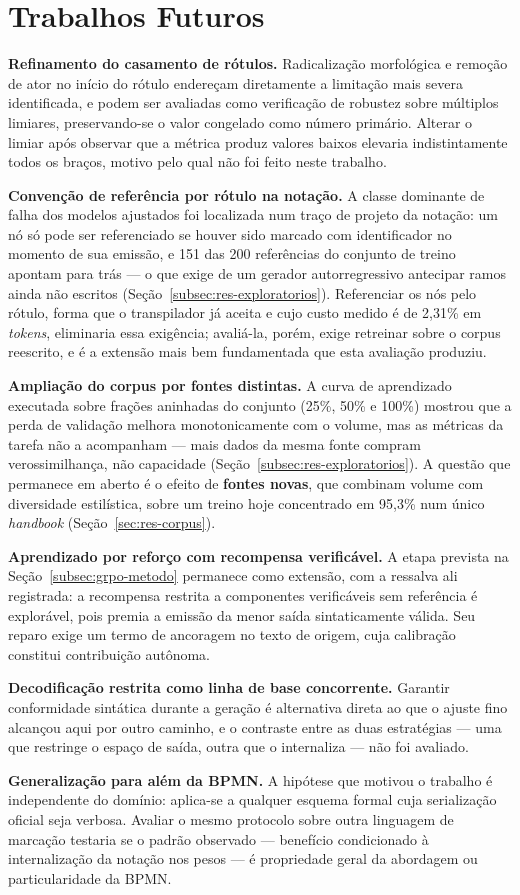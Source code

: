 \section{Trabalhos Futuros}
\label{sec:trabalhos-futuros}

\textbf{Refinamento do casamento de rótulos.} Radicalização morfológica e remoção de ator no início do rótulo endereçam diretamente a limitação mais severa identificada, e podem ser avaliadas como verificação de robustez sobre múltiplos limiares, preservando-se o valor congelado como número primário. Alterar o limiar após observar que a métrica produz valores baixos elevaria indistintamente todos os braços, motivo pelo qual não foi feito neste trabalho.

\textbf{Convenção de referência por rótulo na notação.} A classe dominante de falha dos modelos ajustados foi localizada num traço de projeto da notação: um nó só pode ser referenciado se houver sido marcado com identificador no momento de sua emissão, e 151 das 200 referências do conjunto de treino apontam para trás --- o que exige de um gerador autorregressivo antecipar ramos ainda não escritos (Seção~\ref{subsec:res-exploratorios}). Referenciar os nós pelo rótulo, forma que o transpilador já aceita e cujo custo medido é de 2,31\% em \textit{tokens}, eliminaria essa exigência; avaliá-la, porém, exige retreinar sobre o corpus reescrito, e é a extensão mais bem fundamentada que esta avaliação produziu.

\textbf{Ampliação do corpus por fontes distintas.} A curva de aprendizado executada sobre frações aninhadas do conjunto (25\%, 50\% e 100\%) mostrou que a perda de validação melhora monotonicamente com o volume, mas as métricas da tarefa não a acompanham --- mais dados da mesma fonte compram verossimilhança, não capacidade (Seção~\ref{subsec:res-exploratorios}). A questão que permanece em aberto é o efeito de \textbf{fontes novas}, que combinam volume com diversidade estilística, sobre um treino hoje concentrado em 95,3\% num único \textit{handbook} (Seção~\ref{sec:res-corpus}).

\textbf{Aprendizado por reforço com recompensa verificável.} A etapa prevista na Seção~\ref{subsec:grpo-metodo} permanece como extensão, com a ressalva ali registrada: a recompensa restrita a componentes verificáveis sem referência é explorável, pois premia a emissão da menor saída sintaticamente válida. Seu reparo exige um termo de ancoragem no texto de origem, cuja calibração constitui contribuição autônoma.

\textbf{Decodificação restrita como linha de base concorrente.} Garantir conformidade sintática durante a geração é alternativa direta ao que o ajuste fino alcançou aqui por outro caminho, e o contraste entre as duas estratégias --- uma que restringe o espaço de saída, outra que o internaliza --- não foi avaliado.

\textbf{Generalização para além da BPMN.} A hipótese que motivou o trabalho é independente do domínio: aplica-se a qualquer esquema formal cuja serialização oficial seja verbosa. Avaliar o mesmo protocolo sobre outra linguagem de marcação testaria se o padrão observado --- benefício condicionado à internalização da notação nos pesos --- é propriedade geral da abordagem ou particularidade da BPMN.
